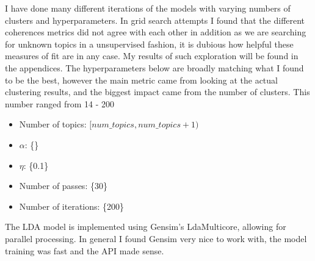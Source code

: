 \documentclass[12pt]{article}
\begin{document}

I have done many different iterations of the models with varying numbers of clusters and
hyperparameters. In grid search attempts I found that the different coherences metrics did not agree
with each other in addition as we are searching for unknown topics in a unsupervised fashion, it is
dubious how helpful these measures of fit are in any case. My results of such exploration will be
found in the appendices. The hyperparameters below are broadly matching what I found to be the best,
however the main metric came from looking at the actual clustering results, and the biggest impact
came from the number of clusters. This number ranged from 14 - 200

\begin{itemize}

	\item Number of topics: $[num\_topics, num\_topics + 1)$

	\item $\alpha$: \{\}

	\item $\eta$: \{0.1\}

	\item Number of passes: \{30\}

	\item Number of iterations: \{200\}

\end{itemize}

The LDA model is implemented using Gensim's LdaMulticore\cite{gensim}, allowing for parallel
processing. In general I found Gensim very nice to work with, the model training was fast and the
API made sense.




\end{document}
